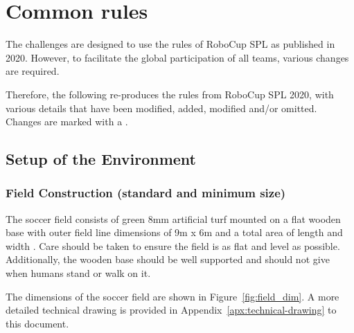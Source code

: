 \section{Common rules}
\label{sec:Common_rules}
The challenges are designed to use the rules of RoboCup SPL as published in 2020. However, to facilitate the global participation of all teams, various changes are required.

Therefore, the following re-produces the rules from RoboCup SPL 2020, with various details that have been modified, added, modified and/or omitted. Changes are marked with a .

\subsection{Setup of the Environment}
\label{sec:environment_setup}
\subsubsection{Field Construction (standard and minimum size)}
\label{sec:field_dim}

The  soccer field consists of green 8mm artificial turf mounted on a flat wooden base with outer field line dimensions of 9m x 6m and a total area of length \TotalLength and width \TotalWidth.  Care should be taken to ensure the field is as flat and level as possible.  Additionally, the wooden base should be well supported and should not give when humans stand or walk on it.


The  dimensions of the soccer field are shown in Figure~\ref{fig:field_dim}.
A more detailed technical drawing is provided in Appendix~\ref{apx:technical-drawing} to this document. 
 
